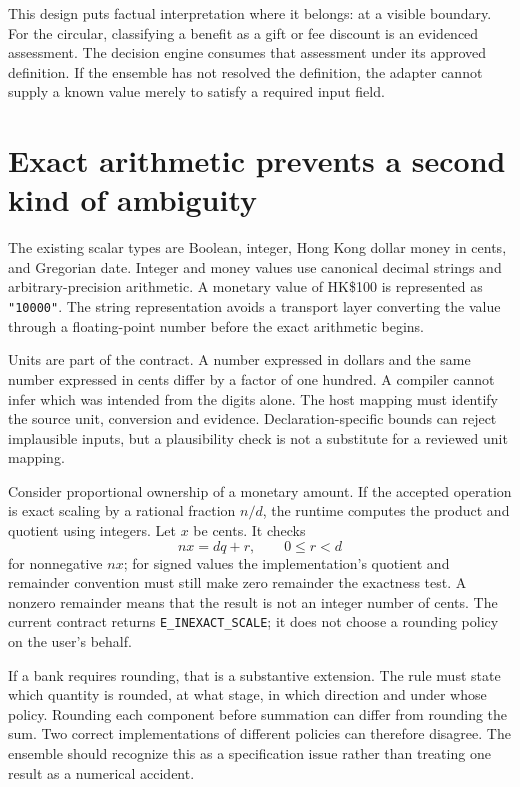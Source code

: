 \documentclass[12pt,a4paper,oneside,openany]{book}
\begin{document}
This design puts factual interpretation where it belongs: at a visible boundary.
For the circular, classifying a benefit as a gift or fee discount is an evidenced
assessment. The decision engine consumes that assessment under its approved
definition. If the ensemble has not resolved the definition, the adapter cannot
supply a known value merely to satisfy a required input field.

\section{Exact arithmetic prevents a second kind of ambiguity}

The existing scalar types are Boolean, integer, Hong Kong dollar money in cents,
and Gregorian date. Integer and money values use canonical decimal strings and
arbitrary-precision arithmetic. A monetary value of HK\$100 is represented as
\texttt{"10000"}. The string representation avoids a transport layer converting
the value through a floating-point number before the exact arithmetic begins.

Units are part of the contract. A number expressed in dollars and the same number
expressed in cents differ by a factor of one hundred. A compiler cannot infer
which was intended from the digits alone. The host mapping must identify the
source unit, conversion and evidence. Declaration-specific bounds can reject
implausible inputs, but a plausibility check is not a substitute for a reviewed
unit mapping.

Consider proportional ownership of a monetary amount. If the accepted operation
is exact scaling by a rational fraction $n/d$, the runtime computes the product
and quotient using integers. Let $x$ be cents. It checks
\begin{equation}
 nx=dq+r,\qquad 0\leq r<d
 \label{eq:exact-scale}
\end{equation}
for nonnegative $nx$; for signed values the implementation's quotient and
remainder convention must still make zero remainder the exactness test. A
nonzero remainder means that the result is not an integer number of cents. The
current contract returns \texttt{E\_INEXACT\_SCALE}; it does not choose a rounding
policy on the user's behalf.

If a bank requires rounding, that is a substantive extension. The rule must state
which quantity is rounded, at what stage, in which direction and under whose
policy. Rounding each component before summation can differ from rounding the
sum. Two correct implementations of different policies can therefore disagree.
The ensemble should recognize this as a specification issue rather than treating
one result as a numerical accident.
\end{document}
